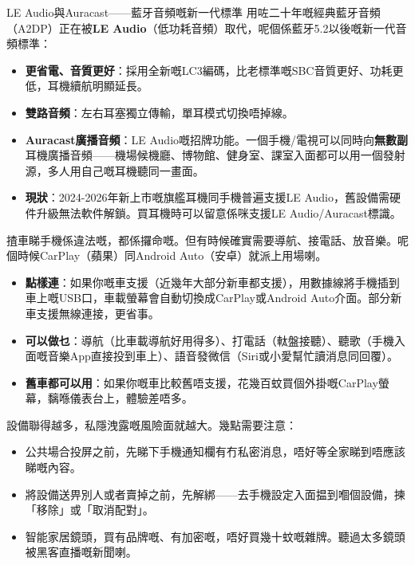 \begin{tcbinfo}{LE Audio與Auracast——藍牙音頻嘅新一代標準}
用咗二十年嘅經典藍牙音頻（A2DP）正在被\textbf{LE Audio}（低功耗音頻）取代，呢個係藍牙5.2以後嘅新一代音頻標準：

\begin{itemize}
  \item \textbf{更省電、音質更好}：採用全新嘅LC3編碼，比老標準嘅SBC音質更好、功耗更低，耳機續航明顯延長。
  \item \textbf{雙路音頻}：左右耳塞獨立傳輸，單耳模式切換唔掉線。
  \item \textbf{Auracast廣播音頻}：LE Audio嘅招牌功能。一個手機/電視可以同時向\textbf{無數副}耳機廣播音頻——機場候機廳、博物館、健身室、課室入面都可以用一個發射源，多人用自己嘅耳機聽同一畫面。
  \item \textbf{現狀}：2024-2026年新上市嘅旗艦耳機同手機普遍支援LE Audio，舊設備需硬件升級無法軟件解鎖。買耳機時可以留意係咪支援LE Audio/Auracast標識。
\end{itemize}

\end{tcbinfo}


揸車睇手機係違法嘅，都係攞命嘅。但有時候確實需要導航、接電話、放音樂。呢個時候CarPlay（蘋果）同Android Auto（安卓）就派上用場喇。

\begin{itemize}
  \item \textbf{點樣連}：如果你嘅車支援（近幾年大部分新車都支援），用數據線將手機插到車上嘅USB口，車載螢幕會自動切換成CarPlay或Android Auto介面。部分新車支援無線連接，更省事。
  \item \textbf{可以做乜}：導航（比車載導航好用得多）、打電話（軚盤接聽）、聽歌（手機入面嘅音樂App直接投到車上）、語音發微信（Siri或小愛幫忙讀消息同回覆）。
  \item \textbf{舊車都可以用}：如果你嘅車比較舊唔支援，花幾百蚊買個外掛嘅CarPlay螢幕，黐喺儀表台上，體驗差唔多。
\end{itemize}


設備聯得越多，私隱洩露嘅風險面就越大。幾點需要注意：

\begin{itemize}
  \item 公共場合投屏之前，先睇下手機通知欄有冇私密消息，唔好等全家睇到唔應該睇嘅內容。
  \item 將設備送畀別人或者賣掉之前，先解綁——去手機設定入面揾到嗰個設備，揀「移除」或「取消配對」。
  \item 智能家居鏡頭，買有品牌嘅、有加密嘅，唔好買幾十蚊嘅雜牌。聽過太多鏡頭被黑客直播嘅新聞喇。
\end{itemize}

